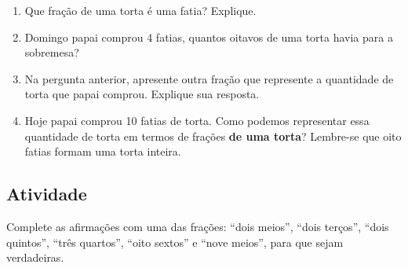 \begin{enumerate} [\quad a)] %
  \item     Que fração de uma torta é uma fatia? Explique.
  \item     Domingo papai comprou 4 fatias, quantos oitavos de uma torta havia para a sobremesa?
  \item     Na pergunta anterior, apresente outra fração que represente a quantidade de torta que papai comprou. Explique sua resposta.
  \item     Hoje papai comprou 10 fatias de torta. Como podemos representar essa quantidade de torta em termos de frações {\bf  de uma torta}? Lembre-se que oito fatias formam uma torta inteira.
\end{enumerate} %

\subsection{Atividade}

Complete as afirmações com uma das frações: ``dois meios'', ``dois terços'', ``dois quintos'', ``três quartos'', ``oito sextos'' e ``nove meios'', para que sejam verdadeiras.

